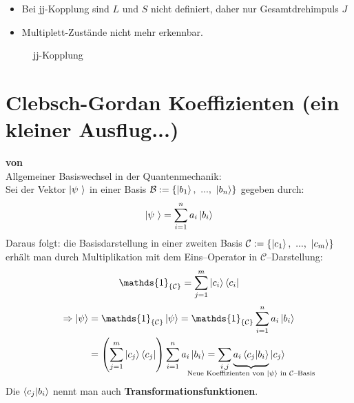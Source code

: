 \documentclass[Ex4_Zusammenfassung.tex]{subfiles}
\begin{document}
\begin{itemize}
	\item Bei jj-Kopplung sind $L$ und $S$ nicht definiert, daher nur Gesamtdrehimpuls $J$
	\item Multiplett-Zustände nicht mehr erkennbar.
\end{itemize}

\begin{figure}[!h]
	\centering
	\caption{jj-Kopplung}
\end{figure}

\section{Clebsch-Gordan Koeffizienten \small{(ein kleiner Ausflug...)}}
\textbf{von \michi}\\

Allgemeiner Basiswechsel in der Quantenmechanik:\\
Sei der Vektor $\ket{\psi\ }$ in einer Basis $\mathcal{B}:= \left\{ \ket{b_1},\ ...,\ \ket{b_n}  \right\}$ gegeben durch:
\begin{equation}
	\ket{\psi\ } = \sum_{i=1}^{n} a_i \ket{b_i}
\end{equation}
Daraus folgt: die Basisdarstellung in einer zweiten Basis $\mathcal{C}:= \left\{ \ket{c_1},\ ...,\ \ket{c_m} \right\}$ erhält man durch Multiplikation mit dem Eins--Operator in $\mathcal{C}$--Darstellung:
\begin{equation}
	\mathds{1}_{ \left\{ \mathcal{C} \right\} } = \sum_{j=1}^{m} \ket{c_i} \bra{c_i}
\end{equation}
\begin{align}
	\Rightarrow \ket{\psi} &= \mathds{1}_{ \left\{ \mathcal{C} \right\} } \ket{\psi} = \mathds{1}_{ \left\{ \mathcal{C} \right\} } \sum_{i=1}^{n} a_i \ket{b_i}\\
	\label{eq:1}
	&= \lp \sum_{j=1}^{m} \ket{c_j} \bra{c_j} \rp \sum_{i=1}^{n} a_i \ket{b_i} = \sum_{i,j} \underbrace{\vphantom{\sum} a_i \braket{c_j | b_i}}_{\mathclap{\text{Neue Koeffizienten von $\ket{\psi}$ in $\mathcal{C}$--Basis} }} \ket{c_j}
\end{align}
Die $\braket{c_j|b_i}$ nennt man auch \textbf{Transformationsfunktionen}.\\
\end{document}
